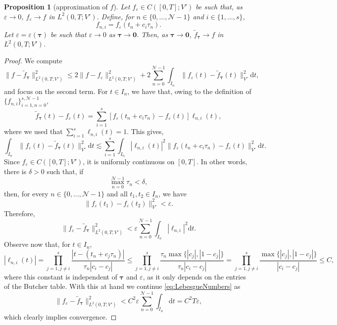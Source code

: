 \documentclass{amsart}
\newcommand{\bftau}{{\boldsymbol{\tau}}}
\newcommand{\mclN}{\mathcal{N}}
\newcommand{\bfzero}{\mathbf{0}}
\newtheorem{proposition}{Proposition}[section]
\theoremstyle{definition}
\newcommand{\diff}{\mathrm{d}}
\newcommand{\AJS}[1]{#1}
\begin{document}
\begin{proposition}[approximation of $f$]
\label{prop:FApprox}
  Let $f_\varepsilon \in C([0,T];V')$ be such that, as $\varepsilon \to 0$, $f_\varepsilon \to f$ in $L^2(0,T;V')$. Define, for $n \in \{0, \ldots, \mclN-1\}$ and $i \in \{1,\ldots, s\}$,
  \[
    f_{n,i} = f_\varepsilon(t_n + c_i \tau_n).
  \]
  Let $\varepsilon = \varepsilon(\bftau)$ be such that $\varepsilon \to 0$ as $\bftau \to \bfzero$. Then, as $\bftau \to \bfzero$, $\tilde{f}_\bftau \to f$ in $L^2(0,T;V')$.
\end{proposition}
\begin{proof}
  We compute
  \[
    \| f - \tilde{f}_\bftau \|_{L^2(0,T;V')}^2 \leq 2\| f - f_\varepsilon \|_{L^2(0,T;V')}^2  + 2  \sum_{n = 0}^{\mclN-1} \int_{I_n} \| f_\varepsilon(t) - \tilde{f}_\bftau(t) \|_{V'}^2 \diff t,
  \]
  and focus on the second term. For $t \in I_n$, we have that, owing to the definition of $\{f_{n,i}\}_{i=1,n=0}^{s,\mclN-1}$,
  \[
    \tilde{f}_\bftau(t) - f_\varepsilon(t) = \sum_{i=1}^s \left[ f_\varepsilon(t_n + c_i \tau_n ) - f_\varepsilon(t) \right] \ell_{n,i}(t),
  \]
  where we used that $\sum_{i=1}^s \ell_{n,i}(t) = 1$. This gives,
  \[
    \int_{I_n} \| f_\varepsilon(t) - \tilde{f}_\bftau(t) \|_{V'}^2 \diff t \lesssim \sum_{i=1}^s \int_{I_n} |\ell_{n,i}(t)|^2 \| f_\varepsilon(t_n + c_i \tau_n ) - f_\varepsilon(t) \|_{V'}^2 \diff t.
  \]
  Since $f_\varepsilon \in C([0,T];V')$, it is uniformly continuous on $[0,T]$. In other words, there is $\delta>0$ such that, if
  \[
    \max_{n =0}^{\mclN-1} \tau_n < \delta,
  \]
  then, for every $n \in \{0, \ldots, \mclN-1\}$ and all $t_1, t_2 \in I_n$, we have
  \[
    \| f_\varepsilon(t_1) - f_\varepsilon(t_2) \|_{V'}^{\AJS{2}} < \varepsilon.
  \]
  Therefore,
  \begin{equation}
  \label{eq:LebesgueNumbers}
    \| f_\varepsilon - \tilde{f}_\bftau \|_{L^2(0,T;V')}^2 < \varepsilon \sum_{n=0}^{\mclN-1} \int_{I_n} |\ell_{n,i}|^2 \diff t.
  \end{equation}
  Observe now that, for $t \in I_n$,
  \[
    |\ell_{n,i}(t)| = \prod_{j=1,j\neq i}^s \frac{|t-(t_n + c_j \tau_n)|}{\tau_n |c_i - c_j|} \leq \prod_{j=1,j\neq i}^s \frac{\tau_n\max\{|c_j|,|1-c_j|\}}{\tau_n |c_i - c_j|} = \prod_{j=1,j\neq i}^s \frac{\max\{|c_j|,|1-c_j|\}}{|c_i - c_j|} \leq C,
  \]
  where this constant is independent of $\bftau$ and $\varepsilon$, as it only depends on the entries of the Butcher table. With this at hand we continue \eqref{eq:LebesgueNumbers} as
  \[
    \| f_\varepsilon - \tilde{f}_\bftau \|_{L^2(0,T;V')}^2 < C^2 \varepsilon \sum_{n=0}^{\mclN-1} \int_{I_n} \diff t = C^2T \varepsilon,
  \]
  which clearly implies convergence.
\end{proof}
\end{document}
